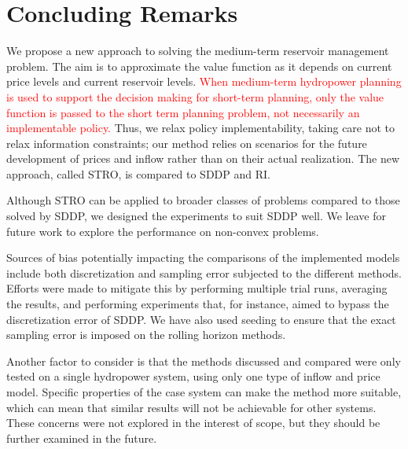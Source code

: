 \section{Concluding Remarks}
\label{Chapter concluding remarks}

We propose a new approach to solving the medium-term reservoir management problem. The aim is to approximate the value function as it depends on current price levels and current reservoir levels. \textcolor{red}{When medium-term hydropower planning is used to support the decision making for short-term planning, only the value function is passed to the short term planning problem, not necessarily an implementable policy.} Thus, we relax policy implementability, taking care not to relax information constraints; our method relies on scenarios for the future development of prices and inflow rather than on their actual realization. The new approach, called STRO, is compared to SDDP and RI.

Although STRO can be applied to broader classes of problems compared to those solved by SDDP, we designed the experiments to suit SDDP well. We leave for future work to explore the performance on non-convex problems. 

Sources of bias potentially impacting the comparisons of the implemented models include both discretization and sampling error subjected to the different methods. Efforts were made to mitigate this by performing multiple trial runs, averaging the results, and performing experiments that, for instance, aimed to bypass the discretization error of SDDP. We have also used seeding to ensure that the exact sampling error is imposed on the rolling horizon methods. 


Another factor to consider is that the methods discussed and compared were only tested on a single hydropower system, using only one type of inflow and price model. Specific properties of the case system can make the method more suitable, which can mean that similar results will not be achievable for other systems. %
These concerns were not explored in the interest of scope, but they should be further examined in the future. 

